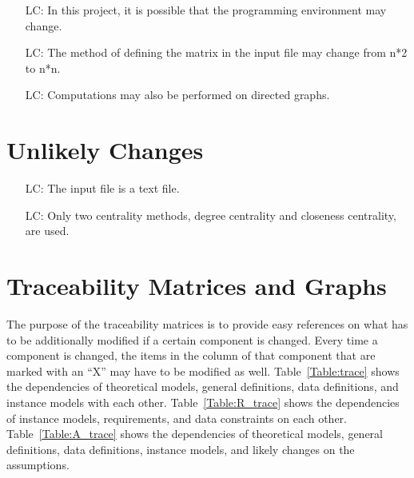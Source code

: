 \documentclass[12pt]{article}
\newcounter{lcnum} %
\begin{document}
\noindent \begin{itemize}

\item[LC\refstepcounter{lcnum}\thelcnum\label{LC_meaningfulLabel}:] In this project, it is possible that the programming environment may change.

\item[LC\refstepcounter{lcnum}\thelcnum\label{LC_meaningfulLabel}:]  The method of defining the matrix in the input file may change from n*2 to n*n.
\item[LC\refstepcounter{lcnum}\thelcnum\label{LC_meaningfulLabel}:]  Computations may also be performed on directed graphs.

\end{itemize}

\section{Unlikely Changes}    

\noindent \begin{itemize}

\item[LC\refstepcounter{lcnum}\thelcnum\label{LC_meaningfulLabel}:] The input file is a text file.
\item[LC\refstepcounter{lcnum}\thelcnum\label{LC_meaningfulLabel}:] Only two centrality methods, degree centrality and closeness centrality, are used.

\end{itemize}

\section{Traceability Matrices and Graphs}

The purpose of the traceability matrices is to provide easy references on what
has to be additionally modified if a certain component is changed.  Every time a
component is changed, the items in the column of that component that are marked
with an ``X'' may have to be modified as well.  Table~\ref{Table:trace} shows the
dependencies of theoretical models, general definitions, data definitions, and
instance models with each other. Table~\ref{Table:R_trace} shows the
dependencies of instance models, requirements, and data constraints on each
other. Table~\ref{Table:A_trace} shows the dependencies of theoretical models,
general definitions, data definitions, instance models, and likely changes on
the assumptions.
\end{document}
